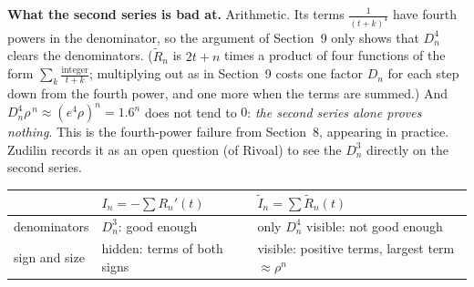 \documentclass[11pt]{article}
\theoremstyle{remark}
\newcommand{\q}[1]{\medskip\noindent\textbf{#1}}
\begin{document}
\q{What the second series is bad at.} Arithmetic. Its terms $\frac1{(t+k)^4}$ have fourth powers in
the denominator, so the argument of Section~9 only shows that $D_n^{4}$ clears the denominators.
($\widetilde R_n$ is $2t+n$ times a product of four functions of the form
$\sum_k\frac{\text{integer}}{t+k}$; multiplying out as in Section~9 costs one factor $D_n$ for each
step down from the fourth power, and one more when the terms are summed.)
And $D_n^4\rho^{\,n}\approx(e^4\rho)^n=1.6^n$ does not tend to $0$: \emph{the second series alone
proves nothing}. This is the fourth-power failure from Section~8, appearing in practice. Zudilin records it as an
open question (of Rivoal) to see the $D_n^3$ directly on the second series.

\begin{center}\small
\begin{tabular}{@{}lll@{}}
\toprule
 & $I_n=-\sum R_n'(t)$ & $\widetilde I_n=\sum\widetilde R_n(t)$\\
\midrule
denominators & $D_n^3$: good enough & only $D_n^4$ visible: not good enough\\
sign and size & hidden: terms of both signs & visible: positive terms, largest term $\approx\rho^n$\\
\bottomrule
\end{tabular}
\end{center}
\end{document}

